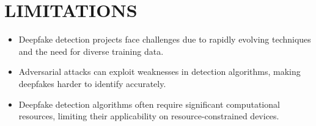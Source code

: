 
\section{LIMITATIONS}
\begin{itemize}
    \item Deepfake detection projects face challenges due to rapidly evolving techniques and the need for diverse training data.
    \item Adversarial attacks can exploit weaknesses in detection algorithms, making deepfakes harder to identify accurately.
    \item Deepfake detection algorithms often require significant computational resources, limiting their applicability on resource-constrained devices.
\end{itemize}